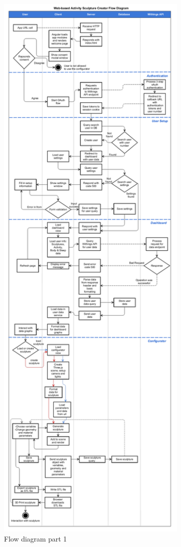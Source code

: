 \documentclass[../medieninformatik-arbeit.tex]{subfiles}
\begin{document}
\begin{figure}[hb!]
\captionsetup{width=\textwidth}
\begin{center}
  \includegraphics[width=0.82\textwidth]{Configurator/img/flow_diagram_1}
  \caption{Flow diagram part 1}
\label{fig:flowdiagram1}
\end{center}
\end{figure}
\end{document}
